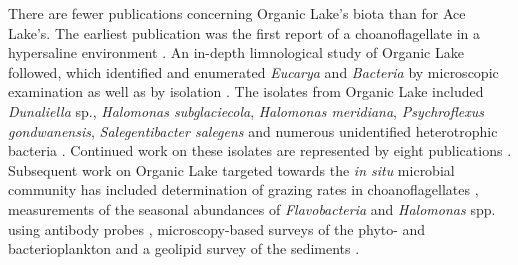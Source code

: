 There are fewer publications concerning Organic Lake's biota than for Ace Lake's.
The earliest publication was the first report of a choanoflagellate in a hypersaline environment \cite{vandenHoff1986}.
An in-depth limnological study of Organic Lake followed, which identified and enumerated \emph{Eucarya} and \emph{Bacteria} by microscopic examination as well as by isolation \cite{Franzmann1987b}.
The isolates from Organic Lake included \emph{Dunaliella} sp., \emph{Halomonas subglaciecola}, \emph{Halomonas meridiana}, \emph{Psychroflexus gondwanensis}, \emph{Salegentibacter salegens} and numerous unidentified heterotrophic bacteria \cite{Franzmann1987b}.
Continued work on these isolates are represented by eight publications \cite{Burch1983, Franzmann1987a, McMeekin1988b, James1990, Dobson1991, Dobson1993, Bowman1998, McCammon2000}.
Subsequent work on Organic Lake targeted towards the \emph{in situ} microbial community has included determination of grazing rates in choanoflagellates \cite{Marchant1993}, measurements of the seasonal abundances of \emph{Flavobacteria} and \emph{Halomonas} spp. using antibody probes \cite{James1994},  microscopy-based surveys of the phyto- and bacterioplankton \cite{Roberts1996, Perriss1997} and a geolipid survey of the sediments \cite{Rogerson1996}.

